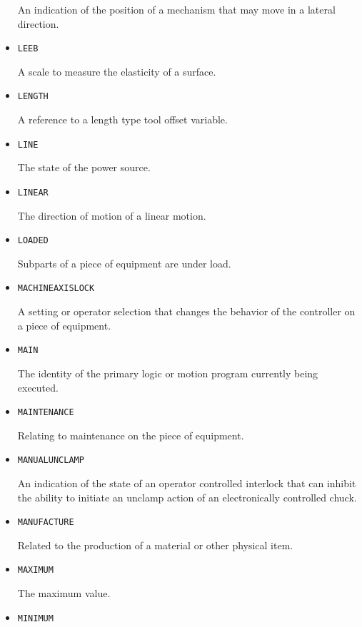 \begin{itemize}
An indication of the position of a mechanism that may move in a lateral direction.


\item \texttt{LEEB}  

A scale to measure the elasticity of a surface.


\item \texttt{LENGTH}  

A reference to a length type tool offset variable.


\item \texttt{LINE}  

The state of the power source.


\item \texttt{LINEAR}  

The direction of motion of a linear motion.


\item \texttt{LOADED}  

Subparts of a piece of equipment are under load.


\item \texttt{MACHINE\textunderscore AXIS\textunderscore LOCK}  

A setting or operator selection that changes the behavior of the controller on a piece of equipment.


\item \texttt{MAIN}  

The identity of the primary logic or motion program currently being executed.


\item \texttt{MAINTENANCE}  

Relating to maintenance on the piece of equipment.


\item \texttt{MANUAL\textunderscore UNCLAMP}  

An indication of the state of an operator controlled interlock that can inhibit the ability to initiate an unclamp action of an electronically controlled chuck.


\item \texttt{MANUFACTURE}  

Related to the production of a material or other physical item.


\item \texttt{MAXIMUM}  

The maximum value.


\item \texttt{MINIMUM}  


\end{itemize}
